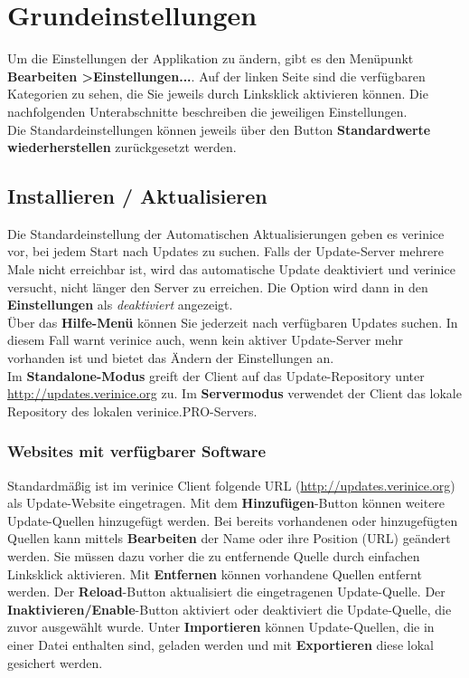 \documentclass[a4paper,10pt]{book}
\begin{document}
\chapter{Grundeinstellungen}
Um die Einstellungen der Applikation zu ändern, gibt es den Menüpunkt \textbf{Bearbeiten \textgreater Einstellungen...}. Auf der linken Seite
sind die verfügbaren Kategorien zu sehen, die Sie jeweils durch Linksklick aktivieren können. Die nachfolgenden Unterabschnitte
beschreiben die jeweiligen Einstellungen.
\newline\\
Die Standardeinstellungen können jeweils über den Button \textbf{Standardwerte wiederherstellen} zurückgesetzt werden.

\section{Installieren / Aktualisieren} \label{Installieren / Aktualisieren}
Die Standardeinstellung der Automatischen Aktualisierungen geben es verinice vor, bei jedem Start nach Updates zu suchen.
Falls der Update-Server mehrere Male nicht erreichbar ist, wird das automatische Update deaktiviert und verinice versucht,
nicht länger den Server zu erreichen. Die Option wird dann in den \textbf{Einstellungen} als {\em deaktiviert} angezeigt.
\newline\\
Über das \textbf{Hilfe-Menü} können Sie jederzeit nach verfügbaren Updates suchen. In diesem Fall warnt verinice auch, wenn kein
aktiver Update-Server mehr vorhanden ist und bietet das Ändern der Einstellungen an.
\newline\\
Im \textbf{Standalone-Modus} greift der Client auf das Update-Repository unter \href{http://updates.verinice.org}{http://updates.verinice.org} zu.
Im \textbf{Servermodus} verwendet der Client das lokale Repository des lokalen verinice.\textsc{PRO}-Servers.

\subsection{Websites mit verfügbarer Software}
Standardmäßig ist im verinice Client folgende URL (\href{http://updates.verinice.org}{http://updates.verinice.org}) als Update-Website eingetragen. Mit dem \textbf{Hinzufügen}-Button
können weitere Update-Quellen hinzugefügt werden. Bei bereits vorhandenen oder hinzugefügten Quellen kann mittels \textbf{Bearbeiten} der
Name oder ihre Position (URL) geändert werden. Sie müssen dazu vorher die zu entfernende Quelle durch einfachen Linksklick aktivieren.
Mit \textbf{Entfernen} können vorhandene Quellen entfernt werden. Der \textbf{Reload}-Button aktualisiert die eingetragenen Update-Quelle.
Der \textbf{Inaktivieren/Enable}-Button aktiviert oder deaktiviert die Update-Quelle, die zuvor ausgewählt wurde. Unter \textbf{Importieren} können
Update-Quellen, die in einer Datei enthalten sind, geladen werden und mit \textbf{Exportieren} diese lokal gesichert werden.
\end{document}
